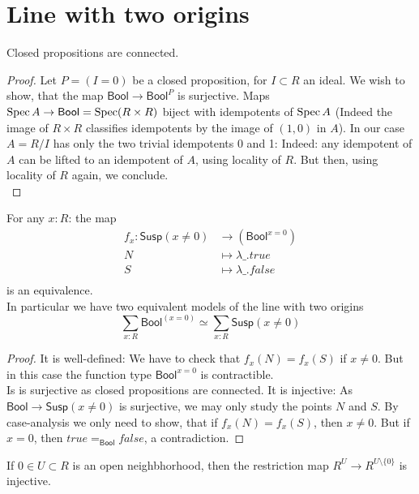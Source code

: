 \documentclass{article}
\newcommand{\Susp}{\mathsf{Susp}}
\newcommand{\Bool}{\mathsf{Bool}}
\begin{document}
\section{Line with two origins}
\begin{lemma}
	Closed propositions are connected.
\end{lemma}
\begin{proof}
	 Let $P = (I = 0)$ be a closed proposition, for $I \subset R$ an ideal. We wish to show, that the map $\Bool \to \Bool^{P}$ is surjective. Maps $\Spec A \to \Bool = \Spec (R \times R)$ biject with idempotents of $\operatorname{Spec} A$ (Indeed the image of $R \times R$ classifies idempotents by the image of $(1,0)$ in $A$). In our case $A = R/I$ has only the two trivial idempotents 0 and 1: Indeed: any idempotent of $A$ can be lifted to an idempotent of $A$, using locality of $R$. But then, using locality of $R$ again, we conclude. \\
\end{proof}
\begin{lemma}{\label{lemma:X1}}
	For any $x : R$: the map
	\begin{align*}
		f_x : \Susp(x \neq 0) &\to \left(\Bool^{x = 0} \right)\\
		N &\mapsto  \lambda \_ . true \\
		S &\mapsto \lambda \_ . false \\
	\end{align*}
	is an equivalence.\\
	In particular we have two equivalent models of the line with two origins
	\[
		\sum_{x : R} \Bool ^(x=0) \simeq \sum_{x : R} \Susp (x\neq0)
	\]
\end{lemma}
\begin{proof}
	It is well-defined: We have to check that $f_x(N) = f_x(S)$ if $x \neq 0$. But in this case the function type $\Bool^{x=0}$ is contractible. \\
	Is is surjective as closed propositions are connected. 
	It is injective: As $\Bool \to \Susp(x \neq 0)$ is surjective, we may only study the points $N$ and $S$. By case-analysis we only need to show, that if $f_x(N) = f_x(S)$, then $x \neq 0$. But if $x = 0$, then $true =_{\Bool} false$, a contradiction. 
\end{proof}
\begin{lemma}{\label{lemma:AlmostEverywhere}}
	If $0 \in U \subset R$ is an open neighbhorhood, then the restriction map $R^U \to R^{U \setminus \{0\}}$ is injective. 
\end{lemma}
\end{document}
